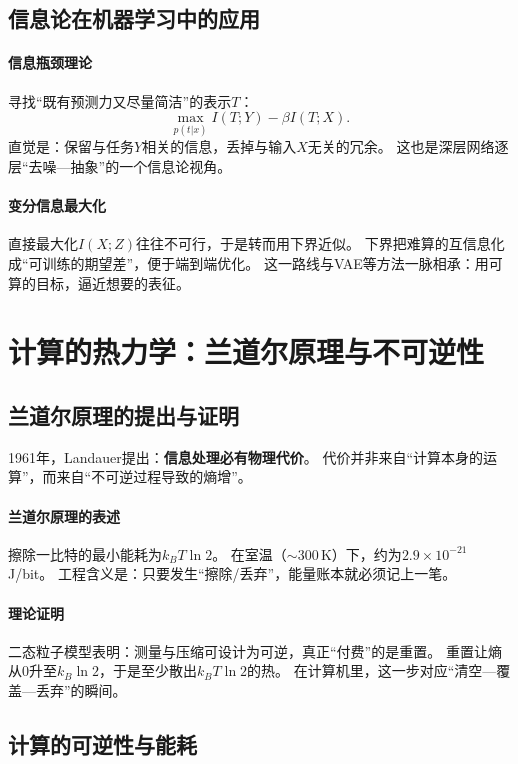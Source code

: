 \subsection{信息论在机器学习中的应用}

\paragraph{信息瓶颈理论}
寻找“既有预测力又尽量简洁”的表示$T$：
$$\max_{p(t|x)} I(T;Y)-\beta I(T;X).$$
直觉是：保留与任务$Y$相关的信息，丢掉与输入$X$无关的冗余。  
这也是深层网络逐层“去噪—抽象”的一个信息论视角。

\paragraph{变分信息最大化}
直接最大化$I(X;Z)$往往不可行，于是转而用下界近似。  
下界把难算的互信息化成“可训练的期望差”，便于端到端优化。  
这一路线与VAE等方法一脉相承：用可算的目标，逼近想要的表征。

\section{计算的热力学：兰道尔原理与不可逆性}

\subsection{兰道尔原理的提出与证明}

1961年，Landauer提出：\textbf{信息处理必有物理代价}。  
代价并非来自“计算本身的运算”，而来自\;“不可逆过程导致的熵增”。

\paragraph{兰道尔原理的表述}
擦除一比特的最小能耗为$k_BT\ln2$。  
在室温（$\sim300\,$K）下，约为$2.9\times10^{-21}$\,J/bit。  
工程含义是：\;只要发生“擦除/丢弃”，能量账本就必须记上一笔。

\paragraph{理论证明}
二态粒子模型表明：测量与压缩可设计为可逆，真正“付费”的是重置。  
重置让熵从$0$升至$k_B\ln2$，于是至少散出$k_BT\ln2$的热。  
在计算机里，这一步对应“清空—覆盖—丢弃”的瞬间。

\subsection{计算的可逆性与能耗}

